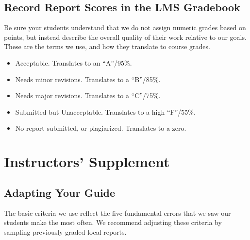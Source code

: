 \documentclass[
]{book}
\providecommand{\tightlist}{%
  \setlength{\itemsep}{0pt}\setlength{\parskip}{0pt}}
\begin{document}
\hypertarget{record-report-scores-in-the-lms-gradebook}{%
\subsection{Record Report Scores in the LMS Gradebook}\label{record-report-scores-in-the-lms-gradebook}}

Be sure your students understand that we do not assign numeric grades based on points, but instead describe the overall quality of their work relative to our goals. These are the terms we use, and how they translate to course grades.

\begin{itemize}
\tightlist
\item
  Acceptable. Translates to an ``A''/95\%.
\item
  Needs minor revisions. Translates to a ``B''/85\%.
\item
  Needs major revisions. Translates to a ``C''/75\%.
\item
  Submitted but Unacceptable. Translates to a high ``F''/55\%.
\item
  No report submitted, or plagiarized. Translates to a zero.
\end{itemize}

\hypertarget{instructors-supplement-7}{%
\section{Instructors' Supplement}\label{instructors-supplement-7}}

\hypertarget{adapting-your-guide-6}{%
\subsection{Adapting Your Guide}\label{adapting-your-guide-6}}

The basic criteria we use reflect the five fundamental errors that we saw our students make the most often. We recommend adjusting these criteria by sampling previously graded local reports.
\end{document}
